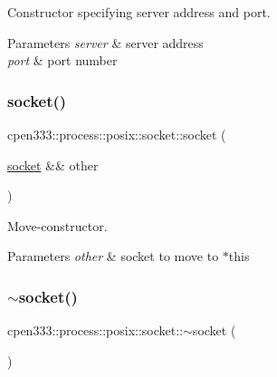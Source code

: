 Constructor specifying server address and port. 


\begin{DoxyParams}{Parameters}
{\em server} & server address \\
\hline
{\em port} & port number \\
\hline
\end{DoxyParams}
\mbox{\label{classcpen333_1_1process_1_1posix_1_1socket_a8c0d036039c11145cc0b342b4006a0aa}} 
\subsubsection{\texorpdfstring{socket()}{socket()}\hspace{0.1cm}{\footnotesize\ttfamily [3/3]}}
{\footnotesize\ttfamily cpen333\+::process\+::posix\+::socket\+::socket (\begin{DoxyParamCaption}\item[{\hyperlink{classcpen333_1_1process_1_1posix_1_1socket}{socket} \&\&}]{other }\end{DoxyParamCaption})\hspace{0.3cm}{\ttfamily [inline]}}



Move-\/constructor. 


\begin{DoxyParams}{Parameters}
{\em other} & socket to move to $\ast$this \\
\hline
\end{DoxyParams}
\mbox{\label{classcpen333_1_1process_1_1posix_1_1socket_ad5dc9ffd6311247114538ec84f2c08a0}} 
\subsubsection{\texorpdfstring{$\sim$socket()}{~socket()}}
{\footnotesize\ttfamily cpen333\+::process\+::posix\+::socket\+::$\sim$socket (\begin{DoxyParamCaption}{ }\end{DoxyParamCaption})\hspace{0.3cm}{\ttfamily [inline]}}



